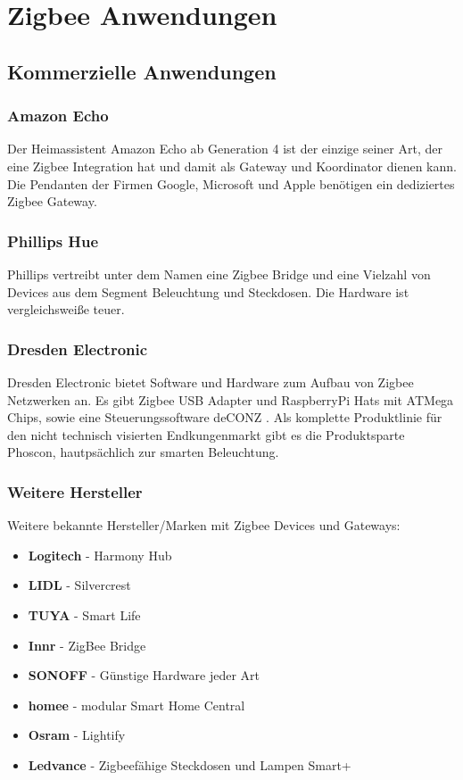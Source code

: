\section{Zigbee Anwendungen}

\subsection{Kommerzielle Anwendungen}

\subsubsection{Amazon Echo}
    Der Heimassistent Amazon Echo ab Generation 4 ist der einzige seiner Art, der eine Zigbee Integration hat und damit als Gateway und Koordinator dienen
    kann. Die Pendanten der Firmen Google, Microsoft und Apple benötigen ein dediziertes Zigbee Gateway.

\subsubsection{Phillips Hue}
    Phillips vertreibt unter dem Namen eine Zigbee Bridge und eine Vielzahl von Devices aus dem Segment Beleuchtung und Steckdosen. Die Hardware ist vergleichsweiße
    teuer.

\subsubsection{Dresden Electronic}
    Dresden Electronic bietet Software und Hardware zum Aufbau von Zigbee Netzwerken an. Es gibt Zigbee USB Adapter und RaspberryPi Hats mit ATMega Chips,
    sowie eine Steuerungssoftware \grqq deCONZ \grqq{}. Als komplette Produktlinie für den nicht technisch visierten Endkungenmarkt gibt es die Produktsparte
    \grqq Phoscon\grqq{}, hautpsächlich zur smarten Beleuchtung.

\subsubsection*{Weitere Hersteller}
Weitere bekannte Hersteller/Marken mit Zigbee Devices und Gateways:
\begin{itemize}
    \item \textbf{Logitech} - Harmony Hub
    \item \textbf{LIDL} - Silvercrest
    \item \textbf{TUYA} - Smart Life
    \item \textbf{Innr} - ZigBee Bridge
    \item \textbf{SONOFF} - Günstige Hardware jeder Art
    \item \textbf{homee} -  modular Smart Home Central
    \item \textbf{Osram} - Lightify
    \item \textbf{Ledvance} - Zigbeefähige Steckdosen und Lampen \grqq Smart+ \grqq{}
\end{itemize}

